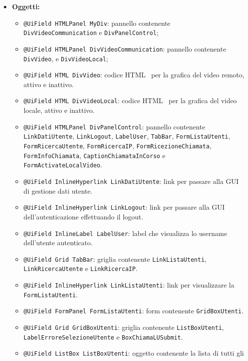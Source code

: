 {\begin{sloppypar}
{\begin{itemize}
\begin{itemize}
				\item[] \textbf{Oggetti:}\\
				\begin{itemize}
					\item[] \texttt{@UiField HTMLPanel MyDiv}: pannello contenente \texttt{DivVideoCommunication} e 
						\texttt{DivPanelControl};
					\item[] \texttt{@UiField HTMLPanel DivVideoCommunication}: pannello contenente \texttt{DivVideo},
						  e \texttt{DivVideoLocal};
					\item[] \texttt{@UiField HTML DivVideo}: codice HTML\g~ per la grafica del video remoto, attivo 
						e inattivo.
					\item[] \texttt{@UiField HTML DivVideoLocal}: codice HTML\g~ per la grafica del video locale, 
						attivo e inattivo.
					\item[] \texttt{@UiField HTMLPanel DivPanelControl}: pannello contenente \texttt{LinkDatiUtente}, 
						\texttt{LinkLogout}, \texttt{LabelUser}, \texttt{TabBar}, \texttt{FormListaUtenti}, 
						\texttt{FormRicercaUtente}, \texttt{FormRicercaIP}, \texttt{FormRicezioneChiamata}, 
						\texttt{FormInfoChiamata}, \texttt{CaptionChiamataInCorso} e \texttt{FormActivateLocalVideo}.
					\item[] \texttt{@UiField InlineHyperlink LinkDatiUtente}: link per passare alla GUI\g~ di 
						gestione dati utente.
					\item[] \texttt{@UiField InlineHyperlink LinkLogout}: link per passare alla GUI\g~ 
						dell'autenticazione effettuando il logout.
					\item[] \texttt{@UiField InlineLabel LabelUser}: label che visualizza lo username dell'utente 
						autenticato.
					\item[] \texttt{@UiField Grid TabBar}: griglia contenente \texttt{LinkListaUtenti}, 
						\texttt{LinkRicercaUtente} e \texttt{LinkRicercaIP}.
					\item[] \texttt{@UiField InlineHyperlink LinkListaUtenti}: link per visualizzare la 
						\texttt{FormListaUtenti}.
					\item[] \texttt{@UiField FormPanel FormListaUtenti}: form contenente \texttt{GridBoxUtenti}.
					\item[] \texttt{@UiField Grid GridBoxUtenti}: griglia contenente \texttt{ListBoxUtenti}, 
						\texttt{LabelErroreSelezioneUtente} e \texttt{BoxChiamaLUSubmit}.
					\item[] \texttt{@UiField ListBox ListBoxUtenti}: oggetto contenente la lista di tutti gli 

\end{itemize}
\end{itemize}
\end{itemize}}
\end{sloppypar}}
